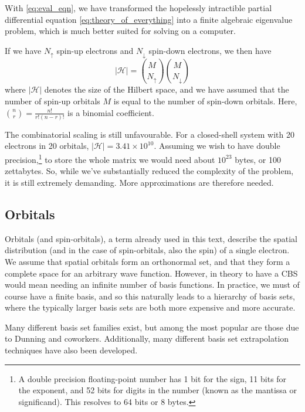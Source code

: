 With \eqref{eq:eval_eqn}, we have transformed the hopelessly intractible partial differential equation \eqref{eq:theory_of_everything} into a finite algebraic eigenvalue problem, which is much better suited for solving on a computer.

If we have $N_\uparrow$ spin-up electrons and $N_\downarrow$ spin-down electrons, we then have
\begin{equation}
\label{eq:scaling}
|\mathcal{H}| = {M \choose N_\uparrow}{M\choose N_\downarrow}
\end{equation}
where $|\mathcal{H}|$ denotes the size of the Hilbert space, and we have assumed that the number of spin-up orbitals $M$ is equal to the number of spin-down orbitals. Here, ${n\choose r}=\frac{n!}{r!(n-r)!}$ is a binomial coefficient.

The combinatorial scaling is still unfavourable. For a closed-shell system with 20 electrons in 20 orbitals, $|\mathcal{H}|=3.41\times 10^{10}$. Assuming we wish to have double precision,\footnote{A double precision floating-point number has 1 bit for the sign, 11 bits for the exponent, and 52 bits for digits in the number (known as the mantissa or significand).\cite{ascherFirst2011} This resolves to 64 bits or 8 bytes.} to store the whole matrix we would need about $10^{23}$ bytes, or 100 zettabytes. So, while we've substantially reduced the complexity of the problem, it is still extremely demanding. More approximations are therefore needed.

\subsection{Orbitals}
\label{sec:orbitals}

Orbitals (and spin-orbitals), a term already used in this text, describe the spatial distribution (and in the case of spin-orbitals, also the spin) of a single electron. We assume that spatial orbitals form an orthonormal set, and that they form a complete space for an arbitrary wave function. However, in theory to have a \gls{CBS} would mean needing an infinite number of basis functions. In practice, we must of course have a finite basis, and so this naturally leads to a hierarchy of basis sets, where the typically larger basis sets are both more expensive and more accurate.

Many different basis set families exist, but among the most popular are those due to Dunning and coworkers.\cite{dunningGaussian1989a} Additionally, many different basis set extrapolation techniques have also been developed.\cite{fellerEffectiveness2011,halkierBasisset1998,halkierBasisset1999,helgakerBasisset1997,jensenBasis1999,pansiniExtrapolation2016,petersonBenchmark1994,woonBenchmark1994}

